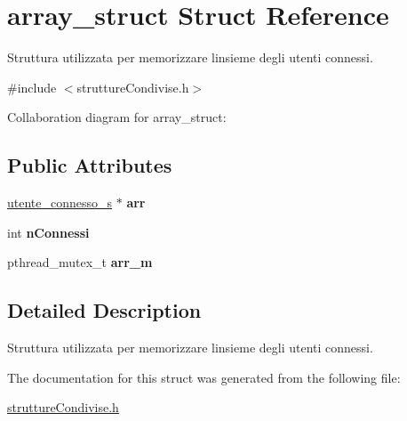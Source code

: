 \hypertarget{structarray__struct}{}\section{array\+\_\+struct Struct Reference}
\label{structarray__struct}


Struttura utilizzata per memorizzare l\textquotesingle{}insieme degli utenti connessi.  




{\ttfamily \#include $<$strutture\+Condivise.\+h$>$}



Collaboration diagram for array\+\_\+struct\+:
\subsection*{Public Attributes}
\begin{DoxyCompactItemize}
\item 
\mbox{\label{structarray__struct_a745f8babfad719c9f1ed50e1198b2534}} 
\hyperlink{structutente__connesso}{utente\+\_\+connesso\+\_\+s} $\ast$ {\bfseries arr}
\item 
\mbox{\label{structarray__struct_a5b078ccac74c03c1c081800122464665}} 
int {\bfseries n\+Connessi}
\item 
\mbox{\label{structarray__struct_a5f1b65c4a60954bc9897060ffab6110e}} 
pthread\+\_\+mutex\+\_\+t {\bfseries arr\+\_\+m}
\end{DoxyCompactItemize}


\subsection{Detailed Description}
Struttura utilizzata per memorizzare l\textquotesingle{}insieme degli utenti connessi. 

The documentation for this struct was generated from the following file\+:\begin{DoxyCompactItemize}
\item 
\hyperlink{struttureCondivise_8h}{strutture\+Condivise.\+h}\end{DoxyCompactItemize}
